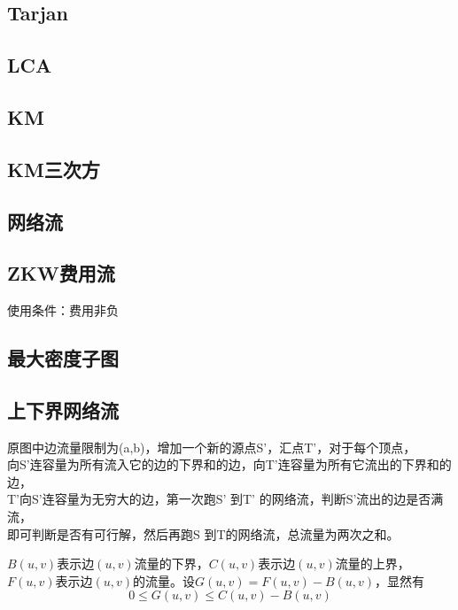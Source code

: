 \documentclass[landscape,a4paper]{article}
\begin{document}
\begin{spacing}{0.3}
\begin{multicols}{3}
		\subsection{Tarjan}
		
		\subsection{LCA}
		
		\subsection{KM}
		
		\subsection{KM三次方}
		
		\subsection{网络流}
		
		\subsection{ZKW费用流}
		使用条件：费用非负
		
		\subsection{最大密度子图}
		
			\subsection{上下界网络流}
原图中边流量限制为(a,b)，增加一个新的源点S’，汇点T’，对于每个顶点，\\
向S’连容量为所有流入它的边的下界和的边，向T’连容量为所有它流出的下界和的边，\\
T’向S’连容量为无穷大的边，第一次跑S’ 到T’ 的网络流，判断S’流出的边是否满流，\\
即可判断是否有可行解，然后再跑S 到T的网络流，总流量为两次之和。

$B(u,v)$表示边$(u,v)$流量的下界，$C(u,v)$表示边$(u,v)$流量的上界，$F(u,v)$表示边$(u,v)$的流量。设$G(u,v) = F(u,v) - B(u,v)$，显然有
	$$0 \leq G(u,v) \leq C(u,v)-B(u,v)$$


\end{multicols}
\end{spacing}
\end{document}
